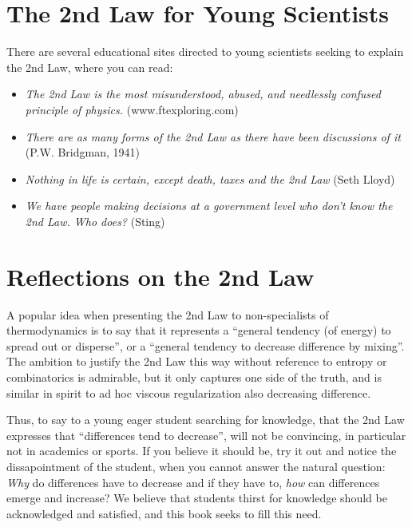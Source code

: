 \section{The 2nd Law for Young Scientists}

There are several educational sites directed to young scientists seeking to
explain the 2nd Law, where you can read:
\begin{itemize} 
\item \emph{The 2nd Law is the most misunderstood, abused, and needlessly
confused principle of physics.} (www.ftexploring.com)
\item \emph{There are as many forms of the 2nd Law as there have been 
discussions of it} (P.W. Bridgman, 1941)
\item \emph{Nothing in life is certain, except death, taxes and the 2nd 
Law} (Seth Lloyd)
\item \emph{We have people making decisions at a government level who don't know the 2nd Law. Who does?} (Sting) 
\end{itemize}

\section{Reflections on the 2nd Law}

A popular idea when presenting the 2nd Law to non-specialists of
thermodynamics 
is to say that it represents a ``general tendency (of energy) to spread out or 
disperse'', or a ``general tendency to decrease difference by
mixing''. The ambition
to justify the 2nd Law this way without reference to entropy
or combinatorics is admirable, but it only captures one side of the 
truth, and is similar in spirit to ad hoc viscous 
regularization also decreasing difference.

Thus, to say to a young eager student searching for knowledge,
that the 2nd Law expresses that ``differences tend to
decrease'', will not be convincing, in particular not in academics or sports.
If you believe it should be, try it out
and notice the dissapointment of the student, when you cannot answer the 
natural question: \emph{Why} do differences have to decrease and if they
have to, \emph{how} can differences emerge and increase?
We believe that students thirst for knowledge should be 
acknowledged and satisfied, and this book seeks to fill this need.

